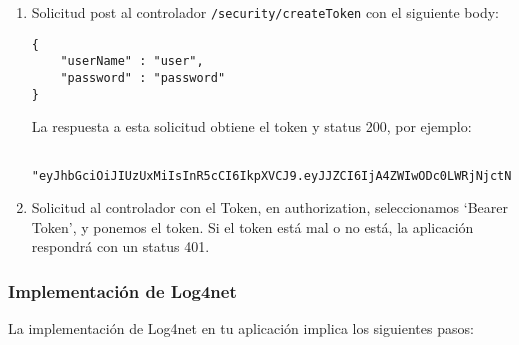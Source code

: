 \documentclass[executivepaper]{article}
\begin{document}
\begin{enumerate}
    \item Solicitud post al controlador \lstinline{/security/createToken} con el siguiente body:
   \begin{lstlisting}
{
    "userName" : "user",
    "password" : "password"
}
\end{lstlisting}
La respuesta a esta solicitud obtiene el token y status 200, por ejemplo:
\begin{lstlisting}
    "eyJhbGciOiJIUzUxMiIsInR5cCI6IkpXVCJ9.eyJJZCI6IjA4ZWIwODc0LWRjNjctNDFhMS1YiI6InVzZXIiLCJlbWFpMTUtOWYxOC.0yMDVlMjhkYTdmMzMiLCJuYmYiOjE2ODkyMDEzOczovL2pveWRpcGthbmppbGFsLmNvbS8pcGthbmppbGFsLmNvbS8ifQ.PZrQGkqDWmu_zPm7m9gbyMDJ4_1zEic6_UPl7cHVUBdX8pon8NstYCXctAibL6rIClcVok4tXLwpzYuGoJAtlA"
\end{lstlisting}
\item Solicitud al controlador con el Token, en authorization, seleccionamos \enquote*{Bearer Token}, y ponemos el token. Si el token está mal o no está, la aplicación respondrá con un status 401.
\end{enumerate}

\subsubsection{Implementación de Log4net}

La implementación de Log4net en tu aplicación implica los siguientes pasos:
\end{document}
